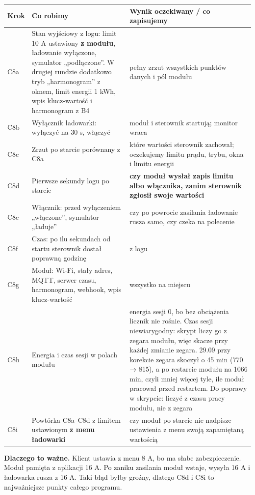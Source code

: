 \documentclass[11pt,a4paper]{article}
\begin{document}
\begin{longtable}{>{\raggedright\arraybackslash}p{3.00cm}>{\raggedright\arraybackslash}p{6.14cm}>{\raggedright\arraybackslash}p{6.14cm}}
\toprule
\rowcolor{apteallight}\textbf{Krok} & \textbf{Co robimy} & \textbf{Wynik oczekiwany / co zapisujemy} \\
\midrule\endhead
\bottomrule\endfoot
C8a & Stan wyjściowy z logu: limit 10 A ustawiony \textbf{z modułu}, ładowanie wyłączone, symulator „podłączone”. W drugiej rundzie dodatkowo tryb „harmonogram” z oknem, limit energii 1 kWh, wpis klucz-wartość i harmonogram z B4 & pełny zrzut wszystkich punktów danych i pól modułu \\
C8b & Wyłącznik ładowarki: wyłączyć na 30 s, włączyć & moduł i sterownik startują; monitor wraca \\
C8c & Zrzut po starcie porównany z C8a & które wartości sterownik zachował; oczekujemy limitu prądu, trybu, okna i limitu energii \\
C8d & Pierwsze sekundy logu po starcie & \textbf{czy moduł wysłał zapis limitu albo włącznika, zanim sterownik zgłosił swoje wartości} \\
C8e & Włącznik: przed wyłączeniem „włączone”, symulator „ładuje” & czy po powrocie zasilania ładowanie rusza samo, czy czeka na polecenie \\
C8f & Czas: po ilu sekundach od startu sterownik dostał poprawną godzinę & z logu \\
C8g & Moduł: Wi-Fi, stały adres, MQTT, serwer czasu, harmonogram, webhook, wpis klucz-wartość & wszystko na miejscu \\
C8h & Energia i czas sesji w polach modułu & energia sesji 0, bo bez obciążenia licznik nie rośnie. Czas sesji niewiarygodny: skrypt liczy go z zegara modułu, więc skacze przy każdej zmianie zegara. 29.09 przy korekcie zegara skoczył o 45 min (770 {\symbolfont→} 815), a po restarcie modułu na 1066 min, czyli mniej więcej tyle, ile moduł pracował przed restartem. Do poprawy w skrypcie: liczyć z czasu pracy modułu, nie z zegara \\
C8i & Powtórka C8a–C8d z limitem ustawionym \textbf{z menu ładowarki} & czy moduł po starcie nie nadpisze ustawienia z menu swoją zapamiętaną wartością \\
\end{longtable}

\textbf{Dlaczego to ważne.} Klient ustawia z menu 8 A, bo ma słabe zabezpieczenie. Moduł pamięta z aplikacji 16 A. Po zaniku zasilania moduł wstaje, wysyła 16 A i ładowarka rusza z 16 A. Taki błąd byłby groźny, dlatego C8d i C8i to najważniejsze punkty całego programu.
\end{document}
